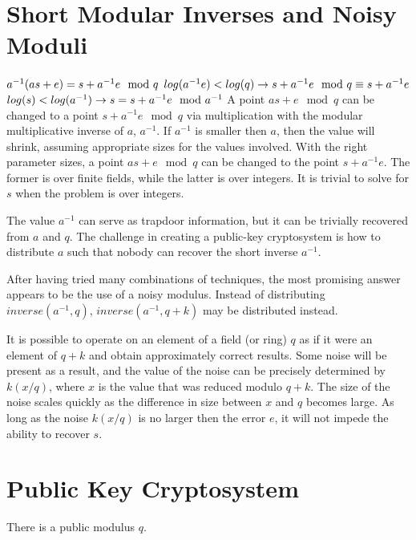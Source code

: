 \documentclass[preprint]{iacrtrans}
\begin{document}
\section{Short Modular Inverses and Noisy Moduli}
$a^{-1} (a s + e) = s + a^{-1} e \mod q\\ \\$
$log(a^{-1} e) < log(q) \rightarrow s + a^{-1} e \mod q \equiv s + a^{-1} e\\ \\$
$log(s) < log(a^{-1}) \rightarrow s = s + a^{-1} e \mod a^{-1}\\ \\$
A point $a s + e \mod q$  can be changed to a point $s + a^{-1} e \mod q$ via multiplication with the modular multiplicative inverse of $a$, $a^{-1}$. If $a^{-1}$ is smaller then $a$, then the value will shrink, assuming appropriate sizes for the values involved. With the right parameter sizes, a point $a s + e \mod q$ can be changed to the point $s + a^{-1} e$. The former is over finite fields, while the latter is over integers. It is trivial to solve for $s$ when the problem is over integers.

The value $a^{-1}$ can serve as trapdoor information, but it can be trivially recovered from $a$ and $q$. The challenge in creating a public-key cryptosystem is how to distribute $a$ such that nobody can recover the short inverse $a^{-1}$.

After having tried many combinations of techniques, the most promising answer appears to be the use of a noisy modulus. Instead of distributing $inverse(a^{-1}, q)$, $inverse(a^{-1}, q + k)$ may be distributed instead.

It is possible to operate on an element of a field (or ring) $q$ as if it were an element of $q + k$ and obtain approximately correct results. Some noise will be present as a result, and the value of the noise can be precisely determined by $k (x / q)$, where $x$ is the value that was reduced modulo $q + k$. The size of the noise scales quickly as the difference in size between $x$ and $q$ becomes large. As long as the noise $k (x / q)$ is no larger then the error $e$, it will not impede the ability to recover $s$.

\section{Public Key Cryptosystem}
There is a public modulus $q$. 
\end{document}
